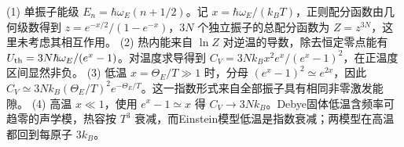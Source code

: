 (1) 单振子能级 \(E_n=\hbar\omega_E(n+1/2)\)。记 \(x=\hbar\omega_E/(k_BT)\)，正则配分函数由几何级数得到 \(z=e^{-x/2}/(1-e^{-x})\)，\(3N\) 个独立振子的总配分函数为 \(Z=z^{3N}\)，这里未考虑其相互作用。
(2) 热内能来自 \(\ln Z\) 对逆温的导数，除去恒定零点能有 \(U_{\rm th}=3N\hbar\omega_E/(e^x-1)\)。对温度求导得到 \(C_V=3Nk_Bx^2e^x/(e^x-1)^2\)，在正温度区间显然非负。
(3) 低温 \(x=\Theta_E/T\gg1\) 时，分母 \((e^x-1)^2\simeq e^{2x}\)，因此 \(C_V\simeq3Nk_B(\Theta_E/T)^2e^{-\Theta_E/T}\)。这一指数形式来自全部振子具有相同非零激发能隙。
(4) 高温 \(x\ll1\)，使用 \(e^x-1\simeq x\) 得 \(C_V\to3Nk_B\)。Debye固体低温含频率可趋零的声学模，热容按 \(T^3\) 衰减，而Einstein模型低温是指数衰减；两模型在高温都回到每原子 \(3k_B\)。
